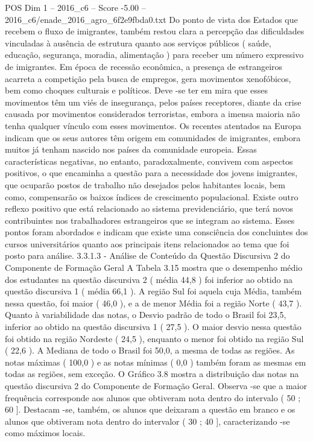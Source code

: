 \begin{textsample}{POS Dim 1 – 2016\_c6 – Score -5.00 – 2016\_c6/enade\_2016\_agro\_6f2e9fbda0.txt}
Do ponto de vista dos Estados que recebem o fluxo de imigrantes, também restou clara a percepção das dificuldades vinculadas à ausência de estrutura quanto aos serviços públicos ( saúde, educação, segurança, moradia, alimentação ) para receber um número expressivo de imigrantes.
Em época de recessão econômica, a presença de estrangeiros acarreta a competição pela busca de empregos, gera movimentos xenofóbicos, bem como choques culturais e políticos.
Deve -se ter em mira que esses movimentos têm um viés de insegurança, pelos países receptores, diante da crise causada por movimentos considerados terroristas, embora a imensa maioria não tenha qualquer vínculo com esses movimentos.
Os recentes atentados na Europa indicam que os seus autores têm origem em comunidades de imigrantes, embora muitos já tenham nascido nos países da comunidade europeia.
Essas características negativas, no entanto, paradoxalmente, convivem com aspectos positivos, o que encaminha a questão para a necessidade dos jovens imigrantes, que ocuparão postos de trabalho não desejados pelos habitantes locais, bem como, compensarão os baixos índices de crescimento populacional.
Existe outro reflexo positivo que está relacionado ao sistema previdenciário, que terá novos contribuintes nos trabalhadores estrangeiros que se integram ao sistema.
Esses pontos foram abordados e indicam que existe uma consciência dos concluintes dos cursos universitários quanto aos principais itens relacionados ao tema que foi posto para análise. 3.3.1.3 - Análise de Conteúdo da Questão Discursiva 2 do Componente de Formação Geral A Tabela 3.15 mostra que o desempenho médio dos estudantes na questão discursiva 2 ( média 44,8 ) foi inferior ao obtido na questão discursiva 1 ( média 66,1 ).
A região Sul foi aquela cuja Média, também nessa questão, foi maior ( 46,0 ), e a de menor Média foi a região Norte ( 43,7 ).
Quanto à variabilidade das notas, o Desvio padrão de todo o Brasil foi 23,5, inferior ao obtido na questão discursiva 1 ( 27,5 ).
O maior desvio nessa questão foi obtido na região Nordeste ( 24,5 ), enquanto o menor foi obtido na região Sul ( 22,6 ).
A Mediana de todo o Brasil foi 50,0, a mesma de todas as regiões.
As notas máximas ( 100,0 ) e as notas mínimas ( 0,0 ) também foram as mesmas em todas as regiões, sem exceção.
O Gráfico 3.8 mostra a distribuição das notas na questão discursiva 2 do Componente de Formação Geral.
Observa -se que a maior frequência corresponde aos alunos que obtiveram nota dentro do intervalo ( 50 ; 60 ].
Destacam -se, também, os alunos que deixaram a questão em branco e os alunos que obtiveram nota dentro do intervalor ( 30 ; 40 ], caracterizando -se como máximos locais.

\end{textsample}
